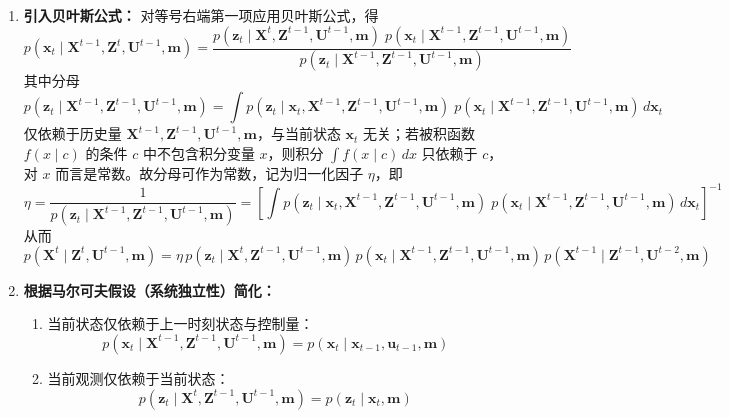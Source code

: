 \documentclass[../main.tex]{subfiles}
\begin{document}
\begin{enumerate}
{\begin{enumerate}
        \item \textbf{引入贝叶斯公式：}
        对等号右端第一项应用贝叶斯公式，得
$$
p(\mathbf{x}_t \mid \mathbf{X}^{t-1}, \mathbf{Z}^{t}, \mathbf{U}^{t-1}, \mathbf{m})
= \frac{
  p(\mathbf{z}_t \mid  \mathbf{X}^{t}, \mathbf{Z}^{t-1}, \mathbf{U}^{t-1}, \mathbf{m})
  \;
  p(\mathbf{x}_t \mid \mathbf{X}^{t-1}, \mathbf{Z}^{t-1}, \mathbf{U}^{t-1}, \mathbf{m})
}{
  p(\mathbf{z}_t \mid \mathbf{X}^{t-1}, \mathbf{Z}^{t-1}, \mathbf{U}^{t-1}, \mathbf{m})
}
$$
其中分母
$$
p(\mathbf{z}_t \mid \mathbf{X}^{t-1}, \mathbf{Z}^{t-1}, \mathbf{U}^{t-1}, \mathbf{m})
= \int 
  p(\mathbf{z}_t \mid \mathbf{x}_t, \mathbf{X}^{t-1}, \mathbf{Z}^{t-1}, \mathbf{U}^{t-1}, \mathbf{m})
  \;
  p(\mathbf{x}_t \mid \mathbf{X}^{t-1}, \mathbf{Z}^{t-1}, \mathbf{U}^{t-1}, \mathbf{m})
  \, d\mathbf{x}_t
$$
仅依赖于历史量 $\mathbf{X}^{t-1}, \mathbf{Z}^{t-1}, \mathbf{U}^{t-1}, \mathbf{m}$，与当前状态 $\mathbf{x}_t$ 无关；若被积函数 $f(x \mid c)$ 的条件 $c$ 中不包含积分变量 $x$，则积分 $\int f(x \mid c) \, dx$ 只依赖于 $c$，对 $x$ 而言是常数。故分母可作为常数，记为归一化因子 $\eta$，即
$$
\eta = \frac{1}{
  p(\mathbf{z}_t \mid \mathbf{X}^{t-1}, \mathbf{Z}^{t-1}, \mathbf{U}^{t-1}, \mathbf{m})
}
= \left[
  \int 
  p(\mathbf{z}_t \mid \mathbf{x}_t, \mathbf{X}^{t-1}, \mathbf{Z}^{t-1}, \mathbf{U}^{t-1}, \mathbf{m})
  \;
  p(\mathbf{x}_t \mid \mathbf{X}^{t-1}, \mathbf{Z}^{t-1}, \mathbf{U}^{t-1}, \mathbf{m})
  \, d\mathbf{x}_t
\right]^{-1}
$$
从而
        \[
        p(\mathbf{X}^{t} \mid \mathbf{Z}^{t}, \mathbf{U}^{t-1}, \mathbf{m})
        = \eta \, p(\mathbf{z}_t \mid \mathbf{X}^{t}, \mathbf{Z}^{t-1}, \mathbf{U}^{t-1}, \mathbf{m})
        \, p(\mathbf{x}_t \mid \mathbf{X}^{t-1}, \mathbf{Z}^{t-1}, \mathbf{U}^{t-1}, \mathbf{m})
        \, p(\mathbf{X}^{t-1} \mid \mathbf{Z}^{t-1}, \mathbf{U}^{t-2}, \mathbf{m})
        \]
        
        \item \textbf{根据马尔可夫假设（系统独立性）简化：}
        \begin{enumerate}
            \item 当前状态仅依赖于上一时刻状态与控制量：
            \[
            p(\mathbf{x}_t \mid \mathbf{X}^{t-1}, \mathbf{Z}^{t-1}, \mathbf{U}^{t-1}, \mathbf{m})
            = p(\mathbf{x}_t \mid \mathbf{x}_{t-1}, \mathbf{u}_{t-1}, \mathbf{m})
            \]
            \item 当前观测仅依赖于当前状态：
            \[
            p(\mathbf{z}_t \mid \mathbf{X}^{t}, \mathbf{Z}^{t-1}, \mathbf{U}^{t-1}, \mathbf{m})
            = p(\mathbf{z}_t \mid \mathbf{x}_t, \mathbf{m})
            \]
        \end{enumerate}
        

\end{enumerate}}
\end{enumerate}
\end{document}
